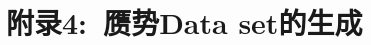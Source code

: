 \documentclass[cjk,slidestop,compress,mathserif,blue]{beamer}
\begin{document}
\section{附录4:~赝势\rm{Data set}的生成}
%
%
%
\end{document}

